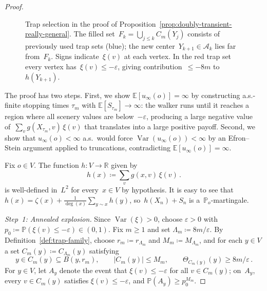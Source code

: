 \documentclass[aop]{imsart}
\theoremstyle{plain}
\theoremstyle{definition}
\newcommand{\R}{\mathbb{R}}
\newcommand{\E}{\mathbb{E}}
\renewcommand{\P}{\mathbb{P}}
\DeclareMathOperator{\var}{Var}
\begin{document}
\begin{proof}
\begin{figure}[t]
			\caption{Trap selection in the proof of Proposition~\ref{prop:doubly-transient-really-general}. The filled set~$F_k=\bigcup_{j\leq k}C_m(Y_j)$ consists of previously used trap sets (blue); the new center~$Y_{k+1}\in\mathcal{A}_k$ lies far from~$F_k$. Signs indicate~$\xi(v)$ at each vertex. In the red trap set every vertex has~$\xi(v)\leq -\varepsilon$, giving contribution~$\leq -8m$ to~$h(Y_{k+1})$.}
			\label{fig:ball-selection}
		\end{figure}
		
		The proof has two steps. First, we show $\E[u_\infty(o)]=\infty$ by constructing a.s.-finite stopping times $\tau_m$ with $\E[S_{\tau_m}]\to\infty$: the walker runs until it reaches a region where all scenery values are below~$-\varepsilon$, producing a large negative value of~$\sum_v g(X_{\tau_m},v)\,\xi(v)$ that translates into a large positive payoff. Second, we show that $u_\infty(o)<\infty$ a.s.\ would force $\var(u_\infty(o))<\infty$ by an Efron--Stein argument applied to truncations, contradicting $\E[u_\infty(o)]=\infty$.
		
		Fix $o\in V$.
		The function $h\colon V\to\R$ given by
		\[
		h(x)\coloneqq\sum_v g(x,v)\,\xi(v)\,.
		\]
		is well-defined in~$L^2$ for every~$x\in V$ by hypothesis.
		It is easy to see that
		$h(x)=\zeta(x)+\frac{1}{\deg(x)}\sum_{y\sim x}h(y)$, so~$h(X_n)+S_n$ is a~$\P_o$-martingale.
		
		\emph{Step~1: Annealed explosion.}
		Since $\var(\xi)>0$, choose $\varepsilon>0$ with $p_0\coloneqq\P(\xi(v)\leq -\varepsilon)\in(0,1)$. Fix $m\geq 1$ and set $\Lambda_m\coloneqq 8m/\varepsilon$. By Definition~\ref{def:trap-family}, choose $r_m\coloneqq r_{\Lambda_m}$ and $M_m\coloneqq M_{\Lambda_m}$, and for each $y\in V$ a set $C_m(y)\coloneqq C_{\Lambda_m}(y)$ satisfying
		\[
		y\in C_m(y)\subseteq B(y,r_m),\qquad |C_m(y)|\leq M_m,\qquad\Theta_{C_m(y)}(y)\geq 8m/\varepsilon\,.
		\]
		For $y\in V$, let $A_y$ denote the event that $\xi(v)\leq -\varepsilon$ for all $v\in C_m(y)$; on~$A_y$, every $v\in C_m(y)$ satisfies $\xi(v)\leq-\varepsilon$, and $\P(A_y)\geq p_0^{M_m}$.
		

\end{proof}
\end{document}
